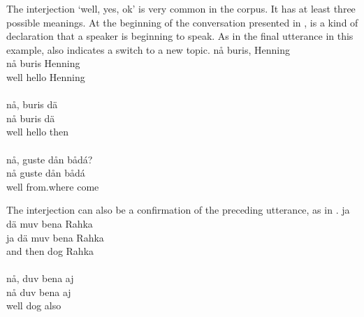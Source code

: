 The interjection  ‘well, yes, ok’ is very common in the corpus. It has at least three possible meanings. At the beginning of the conversation presented in ,  is a kind of declaration that a speaker is beginning to speak. As in the final utterance in this example,  also indicates a switch to a new topic. 
\ea\label{particleEx3}
\glll	{} nå buris, Henning\\
	{} nå buris Henning\\
	{} well hello Henning\\\nopagebreak
{}\\	%
\glll	{} nå, buris dä\\
	{} nå buris dä\\
	{} well hello then\\\nopagebreak
{}\\	%
\glll	{} nå, guste dån bådá?\\
	{} nå guste dån bådá\\
	{} well from.where  come\BS{}\\\nopagebreak
{}	
\z


The interjection  can also be a confirmation of the preceding utterance, as in .
\ea\label{particleEx4}
\glll	{} ja dä muv bena Rahka\\
	{} ja dä muv bena Rahka\\
	{} and then  dog\BS{} Rahka\\\nopagebreak
{}\\
\glll	{} nå, duv bena aj\\
	{} nå duv bena aj\\
	{} well  dog\BS{} also\\\nopagebreak
{}	
\z

